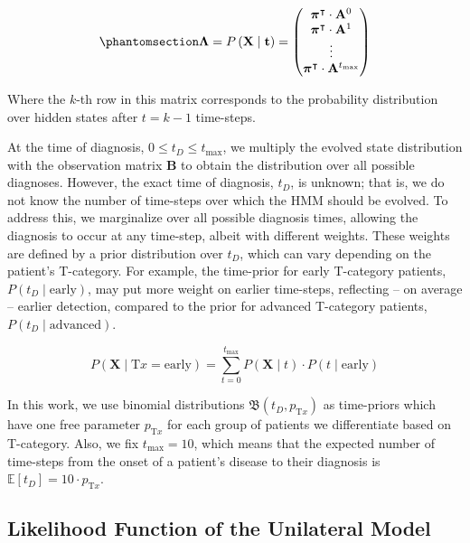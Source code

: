 \documentclass[
  sn-mathphys-num,
]{sn-jnl}
\begin{document}
\begin{equation}\phantomsection\label{eq-lambda-matrix}{
\boldsymbol{\Lambda} = P \left( \mathbf{X} \mid \mathbf{t} \right) = \begin{pmatrix}
\boldsymbol{\pi}^\intercal \cdot \mathbf{A}^0 \\
\boldsymbol{\pi}^\intercal \cdot \mathbf{A}^1 \\
\vdots \\
\boldsymbol{\pi}^\intercal \cdot \mathbf{A}^{t_\text{max}} \\
\end{pmatrix}
}\end{equation}

Where the \(k\)-th row in this matrix corresponds to the probability
distribution over hidden states after \(t=k-1\) time-steps.

At the time of diagnosis, \(0 \leq t_D \leq t_\text{max}\), we multiply
the evolved state distribution with the observation matrix
\(\mathbf{B}\) to obtain the distribution over all possible diagnoses.
However, the exact time of diagnosis, \(t_D\), is unknown; that is, we
do not know the number of time-steps over which the HMM should be
evolved. To address this, we marginalize over all possible diagnosis
times, allowing the diagnosis to occur at any time-step, albeit with
different weights. These weights are defined by a prior distribution
over \(t_D\), which can vary depending on the patient's T-category. For
example, the time-prior for early T-category patients,
\(P(t_D \mid \text{early})\), may put more weight on earlier time-steps,
reflecting -- on average -- earlier detection, compared to the prior for
advanced T-category patients, \(P(t_D \mid \text{advanced})\).

\[
P\left( \mathbf{X} \mid \text{T}x = \text{early} \right) = \sum_{t=0}^{t_\text{max}} P \left( \mathbf{X} \mid t \right) \cdot P(t \mid \text{early})
\]

In this work, we use binomial distributions
\(\mathfrak{B} \left( t_D, p_{\text{T}x} \right)\) as time-priors which
have one free parameter \(p_{\text{T}x}\) for each group of patients we
differentiate based on T-category. Also, we fix \(t_\text{max} = 10\),
which means that the expected number of time-steps from the onset of a
patient's disease to their diagnosis is
\(\mathbb{E}\left[ t_D \right] = 10 \cdot p_{\text{T}x}\).

\subsection{Likelihood Function of the Unilateral
Model}\label{likelihood-function-of-the-unilateral-model}
\end{document}
